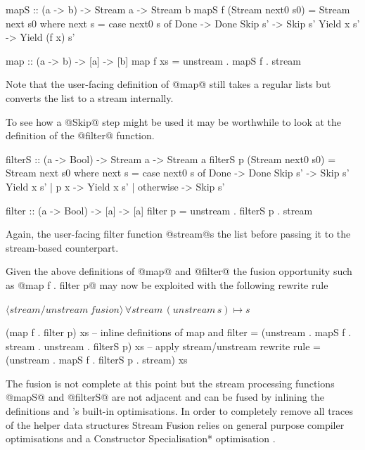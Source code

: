 \documentclass[preamble.tex]{subfiles}
\begin{document}
\begin{hscode}
mapS :: (a -> b) -> Stream a -> Stream b
mapS f (Stream next0 s0) = Stream next s0
  where next s = case next0 s of
    Done       -> Done
    Skip    s' -> Skip        s'
    Yield x s' -> Yield (f x) s'

map :: (a -> b) -> [a] -> [b]
map f xs = unstream . mapS f . stream
\end{hscode}


Note that the user-facing definition of @map@ still takes a regular lists but converts the list to a stream internally.

To see how a @Skip@ step might be used it may be worthwhile to look at the definition of the @filter@ function.

\begin{hscode}
filterS :: (a -> Bool) -> Stream a -> Stream a
filterS p (Stream next0 s0) = Stream next s0
  where next s = case next0 s of
    Done                   -> Done
    Skip    s'             -> Skip    s'
    Yield x s' | p x       -> Yield x s'
               | otherwise -> Skip    s'

filter :: (a -> Bool) -> [a] -> [a]
filter p = unstream . filterS p . stream
\end{hscode}

Again, the user-facing filter function @stream@s the list before passing it to the stream-based counterpart.

Given the above definitions of @map@ and @filter@ the fusion opportunity such as @map f . filter p@ may now be exploited with the following rewrite rule

$\langle \mathit{stream/unstream\ fusion}\rangle\, \forall stream\, (unstream\, s)\mapsto s$

\begin{hscode}
(map f . filter p) xs
  -- inline definitions of map and filter
  = (unstream . mapS f . stream . unstream . filterS p) xs
  -- apply stream/unstream rewrite rule
  = (unstream . mapS f . filterS p . stream) xs
\end{hscode}

The fusion is not complete at this point but the stream processing functions @mapS@ and @filterS@ are not adjacent and can be fused by inlining the definitions and \GHC's built-in optimisations. In order to completely remove all traces of the helper data structures Stream Fusion relies on general purpose compiler optimisations and a \*Constructor Specialisation* optimisation \cite{SpecConstr}.
\end{document}
